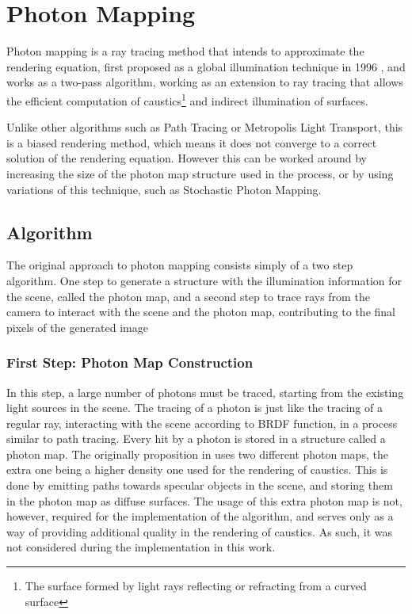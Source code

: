 \documentclass[main.tex]{subfiles}
\begin{document}
\section{Photon Mapping} \label{section:pm}


Photon mapping is a ray tracing method that intends to approximate the rendering equation, first proposed as a global illumination technique in 1996 \cite{jensen1996global}, and works as a two-pass algorithm, working as an extension to ray tracing that allows the efficient computation of caustics\footnote{The surface formed by light rays reflecting or refracting from a curved surface} and indirect illumination of surfaces.

Unlike other algorithms such as Path Tracing or Metropolis Light Transport, this is a biased rendering method, which means it does not converge to a correct solution of the rendering equation. However this can be worked around by increasing the size of the photon map structure used in the process, or by using variations of this technique, such as Stochastic Photon Mapping.

\subsection{Algorithm}

The original approach to photon mapping consists simply of a two step algorithm. One step to generate a structure with the illumination information for the scene, called the photon map, and a second step to trace rays from the camera to interact with the scene and the photon map, contributing to the final pixels of the generated image


\subsubsection{First Step: Photon Map Construction}

In this step, a large number of photons must be traced, starting from the existing light sources in the scene. The tracing of a photon is just like the tracing of a regular ray, interacting with the scene according to \acs{BRDF} function, in a process similar to path tracing. Every hit by a photon is stored in a structure called a photon map.
The originally proposition in \cite{jensen1996global} uses two different photon maps, the extra one being a higher density one used for the rendering of caustics. This is done by emitting paths towards specular objects in the scene, and storing them in the photon map as diffuse surfaces.
The usage of this extra photon map is not, however, required for the implementation of the algorithm, and serves only as a way of providing additional quality in the rendering of caustics. As such, it was not considered during the implementation in this work.
\end{document}
